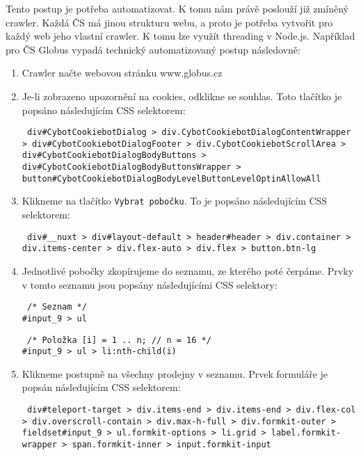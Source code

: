 Tento postup je potřeba automatizovat. K tomu nám právě poslouží již
zmíněný crawler. Každá ČS má jinou strukturu webu, a proto je potřeba
vytvořit pro každý web jeho vlastní crawler. K tomu lze využít threading
v Node.js. Například pro ČS Globus vypadá technický automatizovaný postup
následovně:

\begin{enumerate}
    \item Crawler načte webovou stránku www.globus.cz
    \item Je-li zobrazeno upozornění na cookies, odklikne se souhlas.
        Toto tlačítko je popsáno následujícím CSS selektorem:

        \texttt{
            div\#CybotCookiebotDialog >
            div.CybotCookiebotDialogContentWrapper >
            div\#CybotCookiebotDialogFooter > 
            div.CybotCookiebotScrollArea >
            div\#CybotCookiebotDialogBodyButtons >
            div\#CybotCookiebotDialogBodyButtonsWrapper >
            button\#CybotCookiebotDialogBodyLevelButtonLevelOptinAllowAll
        }

    \item Klikneme na tlačítko \texttt{Vybrat pobočku}. To je popsáno
        následujícím CSS selektorem:

        \texttt{
            div\#\_\_nuxt > div\#layout-default > header\#header >
            div.container > div.items-center > div.flex-auto >
            div.flex > button.btn-lg
        }

    \item Jednotlivé pobočky zkopírujeme do seznamu, ze kterého poté
        čerpáme. Prvky v tomto seznamu jsou popsány následujícími CSS
        selektory:

        \texttt{
            /* Seznam */\\
            \#input\_9 > ul
        }

        \texttt{
            /* Položka [i] = 1 .. n; // n = 16 */\\
            \#input\_9 > ul > li:nth-child(i)
        }

    \item Klikneme postupně na všechny prodejny v seznamu. Prvek
        formuláře je popsán následujícím CSS selektorem:

        \texttt{
            div\#teleport-target > div.items-end > div.items-end >
            div.flex-col > div.overscroll-contain > div.max-h-full >
            div.formkit-outer > fieldset\#input_9 > ul.formkit-options >
            li.grid > label.formkit-wrapper > span.formkit-inner >
            input.formkit-input
        }


\end{enumerate}
